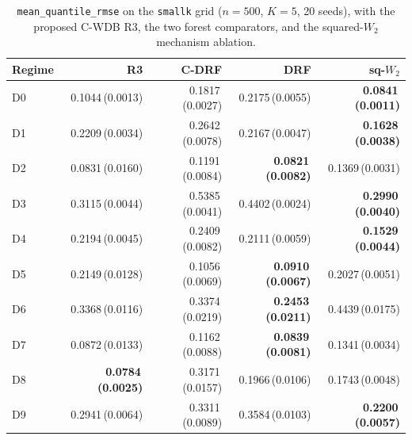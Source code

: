 \begin{table}[htbp]
\centering
\caption{\texttt{mean\_quantile\_rmse} on the \texttt{smallk} grid ($n=500$, $K=5$, 20 seeds), with the proposed C-WDB R3, the two forest comparators, and the squared-$W_2$ mechanism ablation.}
\label{tab:smallk-meanq}
\scriptsize
\setlength{\tabcolsep}{3.2pt}
\begin{tabular}{@{}lrrrr@{}}
\toprule
Regime & R3 & C-DRF & DRF & sq-$W_2$ \\
\midrule
D0 & 0.1044\,(0.0013) & 0.1817\,(0.0027) & 0.2175\,(0.0055) & \textbf{0.0841\,(0.0011)} \\
D1 & 0.2209\,(0.0034) & 0.2642\,(0.0078) & 0.2167\,(0.0047) & \textbf{0.1628\,(0.0038)} \\
D2 & 0.0831\,(0.0160) & 0.1191\,(0.0084) & \textbf{0.0821\,(0.0082)} & 0.1369\,(0.0031) \\
D3 & 0.3115\,(0.0044) & 0.5385\,(0.0041) & 0.4402\,(0.0024) & \textbf{0.2990\,(0.0040)} \\
D4 & 0.2194\,(0.0045) & 0.2409\,(0.0082) & 0.2111\,(0.0059) & \textbf{0.1529\,(0.0044)} \\
D5 & 0.2149\,(0.0128) & 0.1056\,(0.0069) & \textbf{0.0910\,(0.0067)} & 0.2027\,(0.0051) \\
D6 & 0.3368\,(0.0116) & 0.3374\,(0.0219) & \textbf{0.2453\,(0.0211)} & 0.4439\,(0.0175) \\
D7 & 0.0872\,(0.0133) & 0.1162\,(0.0088) & \textbf{0.0839\,(0.0081)} & 0.1341\,(0.0034) \\
D8 & \textbf{0.0784\,(0.0025)} & 0.3171\,(0.0157) & 0.1966\,(0.0106) & 0.1743\,(0.0048) \\
D9 & 0.2941\,(0.0064) & 0.3311\,(0.0089) & 0.3584\,(0.0103) & \textbf{0.2200\,(0.0057)} \\
\bottomrule
\end{tabular}
\end{table}

